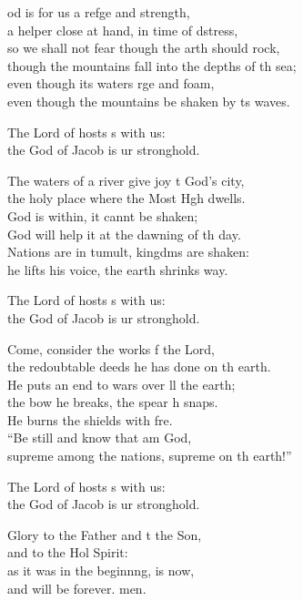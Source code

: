 \settowidth{\versewidth}{though the mountains fall into the depths of the sea;}
\begin{psalmverse}%
  \begin{patverse}
od is for us a refge and strength,\Med\\
a helper close at hand, in time of dstress,\\
so we shall not fear though the arth should rock,\Med\\
though the mountains fall into the depths of th sea;\\
even though its waters rge and foam,\Med\\
even though the mountains be shaken by ts waves.

The Lord of hosts s with us:\Med\\
the God of Jacob is ur stronghold.

The waters of a river give joy t God’s city,\Med\\
the holy place where the Most Hgh dwells.\\
God is within, it cannt be shaken;\Med\\
God will help it at the dawning of th day.\\
Nations are in tumult, kingdms are shaken:\Med\\
he lifts his voice, the earth shrinks way.

The Lord of hosts s with us:\Med\\
the God of Jacob is ur stronghold.

Come, consider the works f the Lord,\Med\\
the redoubtable deeds he has done on th earth.\\
He puts an end to wars over ll the earth;\Med\\
the bow he breaks, the spear h snaps.\\
He burns the shields with fre.\Flex\\
“Be still and know that  am God,\Med\\
supreme among the nations, supreme on th earth!”

The Lord of hosts s with us:\Med\\
the God of Jacob is ur stronghold.

Glory to the Father and t the Son,\Med\\
and to the Hol Spirit:\\
as it was in the beginnng, is now,\Med\\
and will be forever. men. 
  \end{patverse}
\end{psalmverse}
